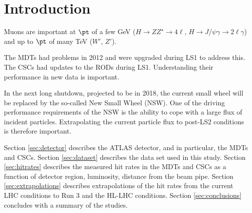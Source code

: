 \section{Introduction}
\label{sec:intro}

Muons are important at $\pt$ of a few GeV ($H\rightarrow ZZ^\star\rightarrow 4\ell$, $H\rightarrow J/\psi \gamma \rightarrow 2\ell\gamma$) and up to $\pt$ of many TeV ($W'$, $Z'$).

The MDTs had problems in 2012 and were upgraded during LS1 to address this. The CSCs had updates to the RODs during LS1. Understanding their performance in new data is important.

In the next long shutdown, projected to be in 2018, the current small wheel will be replaced by the so-called New Small Wheel (NSW). One of the driving performance requirements of the NSW is the ability to cope with a large flux of incident particles. Extrapolating the current particle flux to post-LS2 conditions is therefore important.

Section \ref{sec:detector} describes the ATLAS detector, and in particular, the MDTs and CSCs. Section \ref{sec:dataset} describes the data set used in this study. Section \ref{sec:hitrates} describes the measured hit rates in the MDTs and CSCs as a function of detector region, luminosity, distance from the beam pipe. Section \ref{sec:extrapolations} describes extrapolations of the hit rates from the current LHC conditions to Run 3 and the HL-LHC conditions. Section \ref{sec:conclusions} concludes with a summary of the studies.


